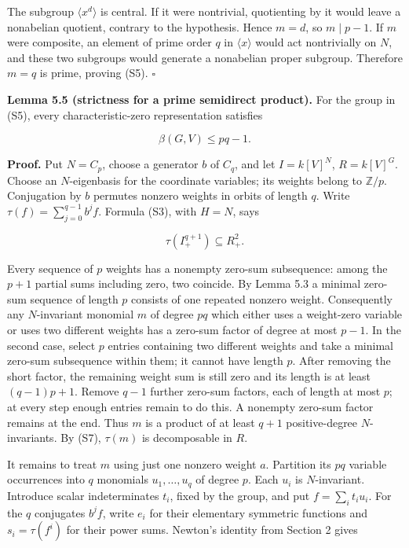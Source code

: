 \documentclass[
]{article}
\begin{document}
The subgroup \(\langle x^d\rangle\) is central. If it were nontrivial,
quotienting by it would leave a nonabelian quotient, contrary to the
hypothesis. Hence \(m=d\), so \(m\mid p-1\). If \(m\) were composite, an
element of prime order \(q\) in \(\langle x\rangle\) would act
nontrivially on \(N\), and these two subgroups would generate a
nonabelian proper subgroup. Therefore \(m=q\) is prime, proving (S5).
\(\square\)

\protect{}\label{lemma-5-5}{}

\textbf{Lemma 5.5 (strictness for a prime semidirect product).} For the
group in (S5), every characteristic-zero representation satisfies
\protect{}\label{equation-S6}{}

\[
\beta(G,V)\leq pq-1.
\tag{S6}
\]

\textbf{Proof.} Put \(N=C_p\), choose a generator \(b\) of \(C_q\), and
let \(I=k [V]^N\), \(R=k [V]^G\). Choose an \(N\)-eigenbasis for the
coordinate variables; its weights belong to \(\mathbb Z/p\). Conjugation
by \(b\) permutes nonzero weights in orbits of length \(q\). Write
\(\tau(f)=\sum_{j=0}^{q-1}b^jf\). Formula (S3), with \(H=N\), says
\protect{}\label{equation-S7}{}

\[
\tau(I_+^{q+1})\subseteq R_+^2.
\tag{S7}
\]

Every sequence of \(p\) weights has a nonempty zero-sum subsequence:
among the \(p+1\) partial sums including zero, two coincide. By Lemma
5.3 a minimal zero-sum sequence of length \(p\) consists of one repeated
nonzero weight. Consequently any \(N\)-invariant monomial \(m\) of
degree \(pq\) which either uses a weight-zero variable or uses two
different weights has a zero-sum factor of degree at most \(p-1\). In
the second case, select \(p\) entries containing two different weights
and take a minimal zero-sum subsequence within them; it cannot have
length \(p\). After removing the short factor, the remaining weight sum
is still zero and its length is at least \((q-1)p+1\). Remove \(q-1\)
further zero-sum factors, each of length at most \(p\); at every step
enough entries remain to do this. A nonempty zero-sum factor remains at
the end. Thus \(m\) is a product of at least \(q+1\) positive-degree
\(N\)-invariants. By (S7), \(\tau(m)\) is decomposable in \(R\).

It remains to treat \(m\) using just one nonzero weight \(a\). Partition
its \(pq\) variable occurrences into \(q\) monomials \(u_1,\ldots,u_q\)
of degree \(p\). Each \(u_i\) is \(N\)-invariant. Introduce scalar
indeterminates \(t_i\), fixed by the group, and put
\(f=\sum_i t_i u_i\). For the \(q\) conjugates \(b^jf\), write \(e_i\)
for their elementary symmetric functions and \(s_i=\tau(f^i)\) for their
power sums. Newton's identity from Section 2 gives
\protect{}\label{equation-S8}{}
\end{document}
